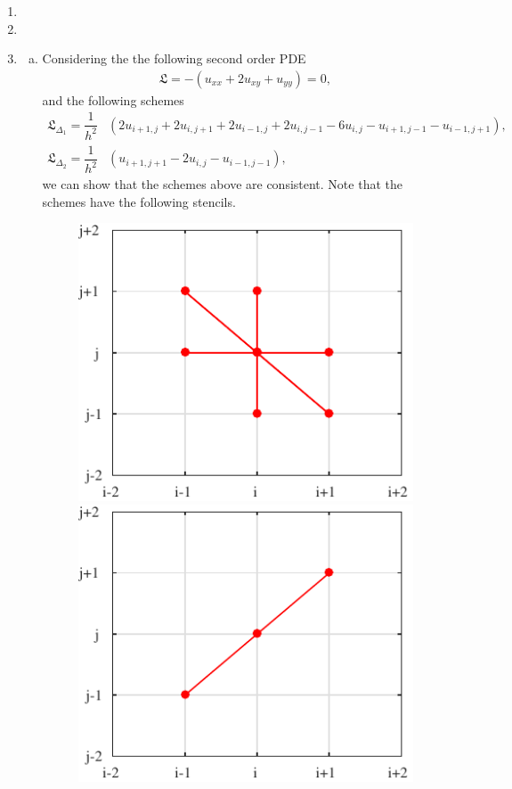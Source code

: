 \documentclass[10pt,a4paper,twoside, french]{article}
\numberwithin{equation}{section}
\numberwithin{figure}{section}
\numberwithin{table}{section}
\begin{document}
\setcounter{section}{1}
\begin{enumerate}
\item
\item
\item \begin{enumerate}[a.]
\item Considering the the following second order PDE
\begin{align*}
\mathfrak{L} = -(u_{xx}+2u_{xy}+u_{yy})=0,
\end{align*}
and the following schemes
\begin{align}
\mathfrak{L}_{\Delta_1}=\dfrac{1}{h^2}&(2u_{i+1,j}+2u_{i,j+1}+2u_{i-1,j}+2u_{i,j-1}-6u_{i,j}-u_{i+1,j-1}-u_{i-1,j+1}),\\
\mathfrak{L}_{\Delta_2}=\dfrac{1}{h^2}&(u_{i+1,j+1}-2u_{i,j}-u_{i-1,j-1}),
\end{align}
we can show that the schemes above are consistent. Note that the schemes have the following stencils.
\begin{figure}[h]
\centering
\includegraphics[scale=.8]{fig/scheme1}
\hspace{.8cm}
\includegraphics[scale=.8]{fig/scheme2}

\end{figure}
\end{enumerate}
\end{enumerate}
\end{document}
